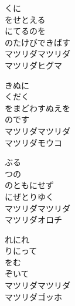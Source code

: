 \documentclass[10pt,b5j]{tarticle} %
\begin{document}
\vspace{1.5em} %
\newcommand{\linespace}{0.5em} %
\newcommand{\blocksize}{0.5\hsize} %
\begin{enumerate} %
    \begin{minipage}[c]{\blocksize}
    
        \vspace{\linespace}
        \item
        くに\\
        をせとえる\\
        にてるのを\\
        のたけびできばす\\
        マツリダマツリダ\\
        マツリダヒグマ
        
        \vspace{\linespace}
        \item
        きぬに\\
        くだく\\
        をまどわすぬえを\\
        のです\\
        マツリダマツリダ\\
        マツリダモウコ
        
        \vspace{\linespace}
        \item
        ぶる\\
        つの\\
        のともにせず\\
        にぜとりゆく\\
        マツリダマツリダ\\
        マツリダオロチ
        
        \vspace{\linespace}
        \item
        れにれ\\
        りにって\\
        をむ\\
        ぞいて\\
        マツリダマツリダ\\
        マツリダゴッホ
    
    \end{minipage}
\end{enumerate} %
\end{document}
